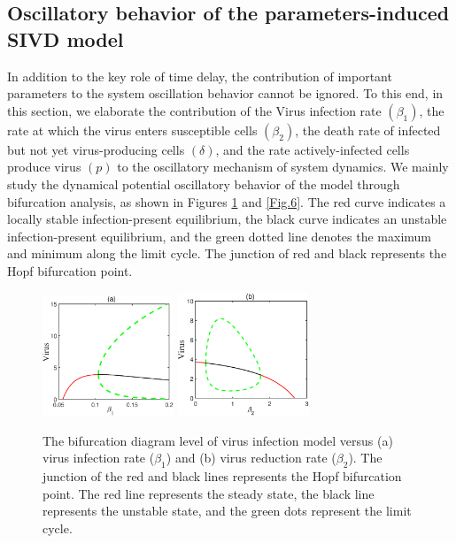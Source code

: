 \documentclass{CMHPhD-SIVD}
\begin{document}
\subsection{Oscillatory behavior of the parameters-induced SIVD model}
In addition to the key role of time delay, the contribution of important parameters to the system oscillation behavior cannot be ignored. To this end,  in this section, we elaborate the contribution of the Virus infection rate $(\beta_1)$, the rate at which the virus enters susceptible cells $(\beta_2)$, the death rate of infected but not yet virus-producing cells $(\delta)$, and the rate actively-infected cells produce virus $(p)$ to the oscillatory mechanism of system dynamics. We mainly study the dynamical potential oscillatory behavior of the model through bifurcation analysis, as shown in Figures \ref{Fig.4} and \ref{Fig.6}. The red curve indicates a locally stable infection-present equilibrium, the black curve indicates an unstable infection-present equilibrium, and the green dotted line denotes the maximum and minimum along the limit cycle. The junction of red and black represents the Hopf bifurcation point.
\begin{figure}[h!]
\centering
\includegraphics[height=0.20\textheight,width=0.35\textwidth]{A1.eps}
\includegraphics[height=0.20\textheight,width=0.35\textwidth]{A2.eps}
\vspace{3mm}
\caption{The bifurcation diagram level of virus infection model versus (a) virus infection rate ($\beta_1$) and (b) virus reduction rate ($\beta_2$). The junction of the red and black lines represents the Hopf bifurcation point. The red line represents the steady state, the black line represents the unstable state, and the green dots represent the limit cycle.}
\label{Fig.4}
\end{figure}
\end{document}
